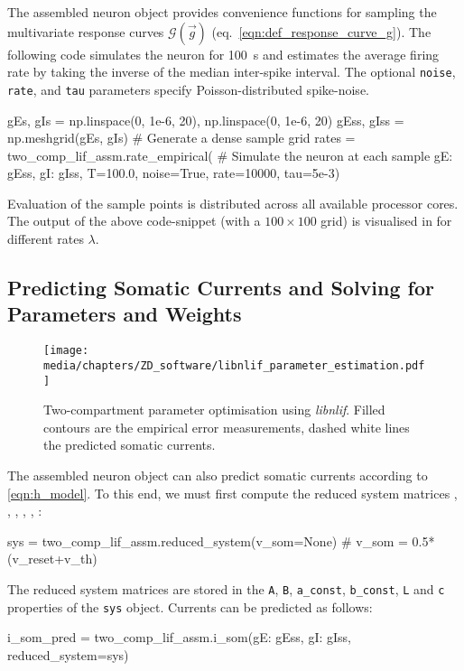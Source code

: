 The assembled neuron object provides convenience functions for sampling the multivariate response curves $\mathscr{G}(\vec g)$ (eq.~\ref{eqn:def_response_curve_g}).
The following code simulates the neuron for \SI{100}{\second} and estimates the average firing rate by taking the inverse of the median inter-spike interval.
The optional \texttt{noise}, \texttt{rate}, and \texttt{tau} parameters specify Poisson-distributed spike-noise.
\begin{pythoncode}
gEs, gIs = np.linspace(0, 1e-6, 20), np.linspace(0, 1e-6, 20) 
gEss, gIss = np.meshgrid(gEs, gIs)        # Generate a dense sample grid
rates = two_comp_lif_assm.rate_empirical( # Simulate the neuron at each sample
	{gE: gEss, gI: gIss}, T=100.0, noise=True, rate=10000, tau=5e-3)
\end{pythoncode}
Evaluation of the sample points is distributed across all available processor cores.
The output of the above code-snippet (with a $100 \times 100$ grid) is visualised in  for different rates $\lambda$.

\subsection{Predicting Somatic Currents and Solving for Parameters and Weights}

\begin{figure}
	\centering
	\texttt{[image: media/chapters/ZD\_software/libnlif\_parameter\_estimation.pdf]}%
	{\label{fig:libnlif_parameter_estimation_a}}%
	{\label{fig:libnlif_parameter_estimation_b}}%
	{\label{fig:libnlif_parameter_estimation_c}}%
	\caption[Two-compartment LIF parameter optimisation using \emph{libnlif}]{Two-compartment \LIF parameter optimisation using \emph{libnlif}.
	Filled contours are the empirical error measurements, dashed white lines the predicted somatic currents.}
	\label{fig:libnlif_parameter_estimation}
\end{figure}

The assembled neuron object can also predict somatic currents according to \cref{eqn:h_model}.
To this end, we must first compute the reduced system matrices \mrAp, \mrBp, \vrap, \vrbp, \mrL, \vrc:
\begin{pythoncode}
sys = two_comp_lif_assm.reduced_system(v_som=None) # v_som = 0.5*(v_reset+v_th)
\end{pythoncode}
The reduced system matrices are stored in the \texttt{A}, \texttt{B}, \texttt{a\_const}, \texttt{b\_const}, \texttt{L} and \texttt{c} properties of the \texttt{sys} object.
Currents can be predicted as follows:
\begin{pythoncode}
i_som_pred = two_comp_lif_assm.i_som({gE: gEss, gI: gIss}, reduced_system=sys)
\end{pythoncode}

